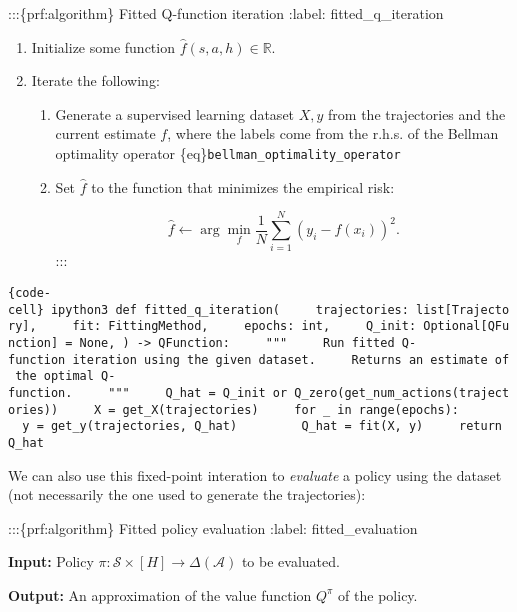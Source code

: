 :::\{prf:algorithm\} Fitted Q-function iteration :label:
fitted\_q\_iteration

\begin{enumerate}
\def\labelenumi{\arabic{enumi}.}
\tightlist
\item
  Initialize some function \(\hat f(s, a, h) \in \mathbb{R}\).
\item
  Iterate the following:

  \begin{enumerate}
  \def\labelenumii{\arabic{enumii}.}
  \item
    Generate a supervised learning dataset \(X, y\) from the
    trajectories and the current estimate \(f\), where the labels come
    from the r.h.s. of the Bellman optimality operator
    \{eq\}\texttt{bellman\_optimality\_operator}
  \item
    Set \(\hat f\) to the function that minimizes the empirical risk:

    \[\hat f \gets \arg\min_f \frac{1}{N} \sum_{i=1}^N (y_i - f(x_i))^2.\]
    :::
  \end{enumerate}
\end{enumerate}

\texttt{\{code-cell\}\ ipython3\ def\ fitted\_q\_iteration(\ \ \ \ \ trajectories:\ list{[}Trajectory{]},\ \ \ \ \ fit:\ FittingMethod,\ \ \ \ \ epochs:\ int,\ \ \ \ \ Q\_init:\ Optional{[}QFunction{]}\ =\ None,\ )\ -\textgreater{}\ QFunction:\ \ \ \ \ """\ \ \ \ \ Run\ fitted\ Q-function\ iteration\ using\ the\ given\ dataset.\ \ \ \ \ Returns\ an\ estimate\ of\ the\ optimal\ Q-function.\ \ \ \ \ """\ \ \ \ \ Q\_hat\ =\ Q\_init\ or\ Q\_zero(get\_num\_actions(trajectories))\ \ \ \ \ X\ =\ get\_X(trajectories)\ \ \ \ \ for\ \_\ in\ range(epochs):\ \ \ \ \ \ \ \ \ y\ =\ get\_y(trajectories,\ Q\_hat)\ \ \ \ \ \ \ \ \ Q\_hat\ =\ fit(X,\ y)\ \ \ \ \ return\ Q\_hat}

We can also use this fixed-point interation to \emph{evaluate} a policy
using the dataset (not necessarily the one used to generate the
trajectories):

:::\{prf:algorithm\} Fitted policy evaluation :label: fitted\_evaluation

\textbf{Input:} Policy
\(\pi : \mathcal{S} \times [H] \to \Delta(\mathcal{A})\) to be
evaluated.

\textbf{Output:} An approximation of the value function \(Q^\pi\) of the
policy.

